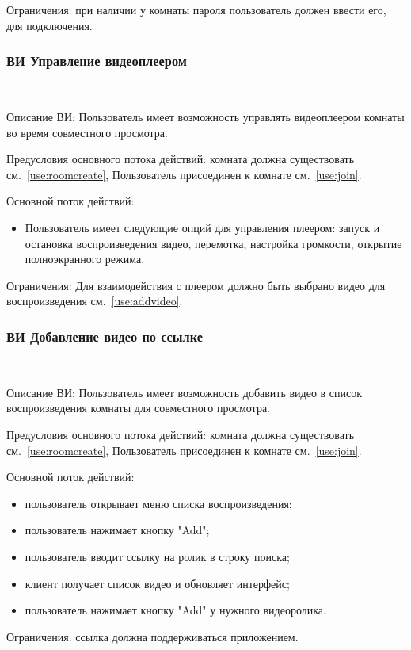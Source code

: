 Ограничения: при наличии у комнаты пароля пользователь должен ввести его, для подключения.
 
\subsubsection{ВИ Управление видеоплеером}~\par
Описание ВИ: Пользователь имеет возможность управлять видеоплеером комнаты во время совместного просмотра.
 
Предусловия основного потока действий: комната должна существовать см.~\ref{use:roomcreate}, Пользователь присоединен к комнате см.~\ref{use:join}.
 
Основной поток действий:
\begin{itemize}
   \item Пользователь имеет следующие опций для управления плеером: запуск и остановка воспроизведения видео, перемотка, настройка громкости, открытие полноэкранного режима.
\end{itemize}
 
Ограничения: Для взаимодействия с плеером должно быть выбрано видео для воспроизведения см.~\ref{use:addvideo}.
 
\subsubsection{ВИ Добавление видео по ссылке}~\par
\label{use:addvideo}
Описание ВИ: Пользователь имеет возможность добавить видео в список воспроизведения комнаты для совместного просмотра.
 
Предусловия основного потока действий: комната должна существовать см.~\ref{use:roomcreate}, Пользователь присоединен к комнате см.~\ref{use:join}.
 
Основной поток действий:
\begin{itemize}
   \item пользователь открывает меню списка воспроизведения;
   \item пользователь нажимает кнопку "Add";
   \item пользователь вводит ссылку на ролик в строку поиска;
   \item клиент получает список видео и обновляет интерфейс;
   \item пользователь нажимает кнопку "Add" у нужного видеоролика.
\end{itemize}
 
Ограничения: ссылка должна поддерживаться приложением.
 
